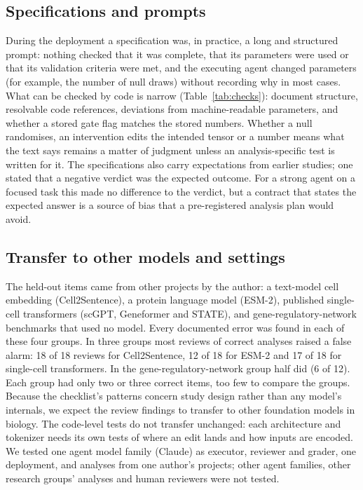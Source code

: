 \documentclass[10pt,letterpaper]{article}
\begin{document}
\subsection*{Specifications and prompts}
During the deployment a specification was, in practice, a long and
structured prompt: nothing checked that it was complete, that its
parameters were used or that its validation criteria were met, and the
executing agent changed parameters (for example, the number of null
draws) without recording why in most cases. What can be checked by code
is narrow (Table~\ref{tab:checks}): document structure, resolvable code
references, deviations from machine-readable parameters, and whether a
stored gate flag matches the stored numbers. Whether a null randomises,
an intervention edits the intended tensor or a number means what the text
says remains a matter of judgment unless an analysis-specific test is
written for it. The specifications also carry expectations from earlier
studies; one stated that a negative verdict was the expected outcome. For
a strong agent on a focused task this made no difference to the verdict,
but a contract that states the expected answer is a source of bias that a
pre-registered analysis plan would avoid.

\subsection*{Transfer to other models and settings}
The held-out items came from other projects by the author: a text-model
cell embedding (Cell2Sentence), a protein language model (ESM-2), published
single-cell transformers (scGPT, Geneformer and STATE), and
gene-regulatory-network benchmarks that used no model. Every documented
error was found in each of these four groups. In three groups most
reviews of correct analyses raised a false alarm: 18 of 18 reviews for
Cell2Sentence, 12 of 18 for ESM-2 and 17 of 18 for single-cell
transformers. In the gene-regulatory-network group half did (6 of 12).
Each group had only two or three correct items, too few to compare the
groups. Because the checklist's patterns concern study
design rather than any model's internals, we expect the review findings
to transfer to other foundation models in biology. The code-level tests do not transfer
unchanged: each architecture and tokenizer needs its own tests of where an
edit lands and how inputs are encoded. We tested one agent model family
(Claude) as executor, reviewer and grader, one deployment, and analyses
from one author's projects; other agent families, other research groups'
analyses and human reviewers were not tested.
\end{document}
